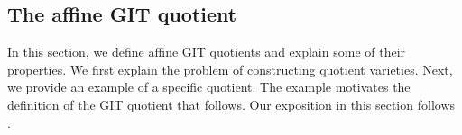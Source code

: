 \documentclass[12pt]{amsart}
\theoremstyle{plain}
\begin{document}

\newpage
\subsection{The affine GIT quotient}\label{section:gitquotient}
In this section, we define affine GIT quotients and explain some of their properties.
We first explain the problem of constructing quotient varieties.
Next, we provide an example of a specific quotient.
The example motivates the definition of the GIT quotient that follows.
Our exposition in this section follows \cite[\S 5.1]{Mukai03}.
\end{document}
